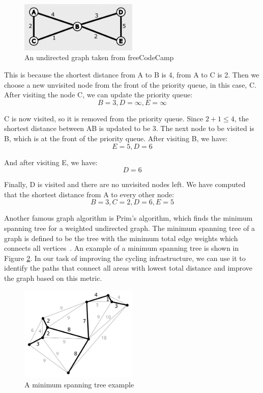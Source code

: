\documentclass[12pt,a4paper]{report}
\begin{document}
\begin{figure}[ht]
\centering
\includegraphics[width=0.5\textwidth]{plan_images/dijkstra.png}
\caption{An undirected graph taken from freeCodeCamp~\cite{abba2022}}
\label{fig:dijkstra_example}
\end{figure}

This is because the shortest distance from A to B is 4, from A to C is 2. Then we choose a new unvisited node from the front of the priority queue, in this case, C. After visiting the node C, we can update the priority queue:
\[B=3, D=\infty, E=\infty\]

C is now visited, so it is removed from the priority queue. Since $2+1 \leq 4$, the shortest distance between AB is updated to be 3. The next node to be visited is B, which is at the front of the priority queue. After visiting B, we have:
\[E=5, D=6\]

And after visiting E, we have:
\[D=6\]

Finally, D is visited and there are no unvisited nodes left. We have computed that the shortest distance from A to every other node:
\[B=3, C=2, D=6, E=5\]

Another famous graph algorithm is Prim's algorithm, which finds the minimum spanning tree for a weighted undirected graph. The minimum spanning tree of a graph is defined to be the tree with the minimum total edge weights which connects all vertices~\cite{Pettie2008}. An example of a minimum spanning tree is shown in Figure \ref{fig:mst_example}. In our task of improving the cycling infrastructure, we can use it to identify the paths that connect all areas with lowest total distance and improve the graph based on this metric.

\begin{figure}[ht]
\centering
\includegraphics[width=0.5\textwidth]{plan_images/MST.png}
\caption{A minimum spanning tree example\protect\footnotemark}
\label{fig:mst_example}
\end{figure}
\end{document}

